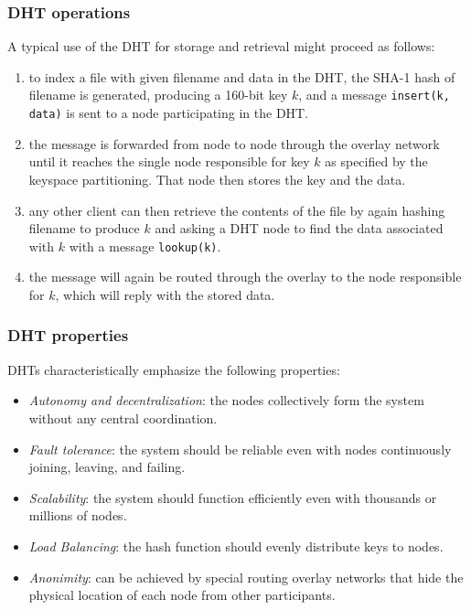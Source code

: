 \documentclass[a4paper,12pt]{article}
\begin{document}
\subsubsection{DHT operations}

A typical use of the DHT for storage and retrieval might proceed as follows:
\begin{enumerate}[label=\arabic*.]
  \item to index a file with given filename and data in the DHT, the SHA-1 hash of filename is generated, producing a 160-bit key $k$, and a message \texttt{insert(k, data)} is sent to a node participating in the DHT.
  \item the message is forwarded from node to node through the overlay network until it reaches the single node responsible for key $k$ as specified by the keyspace partitioning. That node then stores the key and the data.
  \item any other client can then retrieve the contents of the file by again hashing filename to produce $k$ and asking a DHT node to find the data associated with $k$ with a message \texttt{lookup(k)}.
  \item the message will again be routed through the overlay to the node responsible for $k$, which will reply with the stored data.
\end{enumerate}

\subsubsection{DHT properties}

DHTs characteristically emphasize the following properties:
\begin{itemize}
  \item \textit{Autonomy and decentralization}: the nodes collectively form the system without any central coordination.
  \item \textit{Fault tolerance}: the system should be reliable even with nodes continuously joining, leaving, and failing.
  \item \textit{Scalability}: the system should function efficiently even with thousands or millions of nodes.
  \item \textit{Load Balancing}: the hash function should evenly distribute keys to nodes.
  \item \textit{Anonimity}: can be achieved by special routing overlay networks that hide the physical location of each node from other participants.
\end{itemize}
\end{document}
